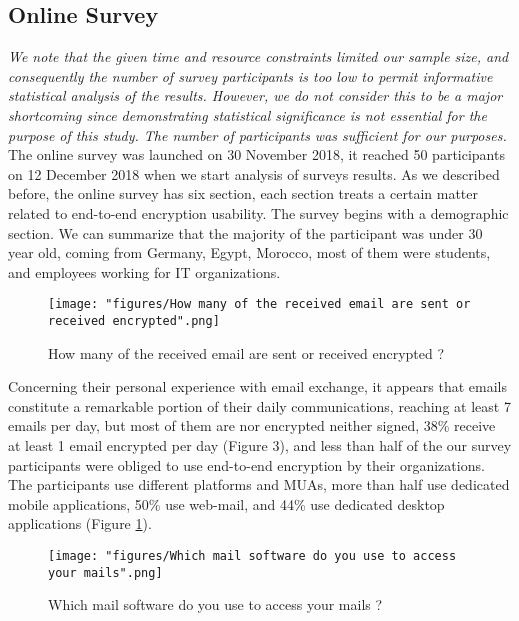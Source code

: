 \subsection{Online Survey}
\textit{We note that the given time and resource constraints limited our sample size, and consequently the number of survey participants is too low to permit informative statistical analysis of the results. However, we do not consider this to be a major shortcoming since demonstrating statistical significance is not essential for the purpose of this study. The number of participants was sufficient for our purposes.}
\newline
The online survey was launched on 30 November 2018, it reached 50 participants on 12 December 2018 when we start analysis of surveys results.
\newline
As we described before, the online survey has six section, each section treats a certain matter related to end-to-end encryption usability. The survey begins with a demographic section. We can summarize that the majority of the participant was under 30 year old, coming from Germany, Egypt, Morocco, most of them were students, and employees working for IT organizations.
\newline
\newline
\begin{figure}
	\texttt{[image: "figures/How many of the received email are sent or received encrypted".png]}
	\centering
	\caption{How many of the received email are sent or received encrypted ?}
\end{figure}
Concerning their personal experience with email exchange, it appears that emails constitute a remarkable portion of their daily communications, reaching at least 7 emails per day, but most of them are nor encrypted neither signed, 38\% receive at least 1 email encrypted per day (Figure 3), and less than half of the our survey participants were obliged to use end-to-end encryption by their organizations.
\newline
\newline
The participants use different platforms and MUAs, more than half use dedicated mobile applications, 50\% use web-mail, and 44\% use dedicated desktop applications (Figure \ref{fig:encryptedemail}).
\newline
\newline
\begin{figure}
	\texttt{[image: "figures/Which mail software do you use to access your mails".png]}
	\centering
	\caption{Which mail software do you use to access your mails ?}
	\label{fig:encryptedemail}
\end{figure}
